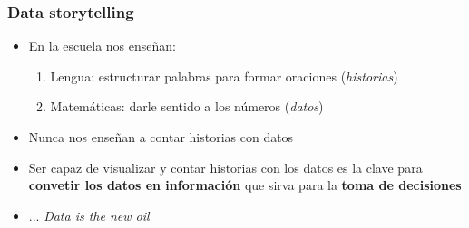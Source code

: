 \begin{frame}
    \frametitle{Data storytelling}
    \begin{itemize}
        \item<1-> En la escuela nos enseñan:
        \begin{enumerate}
            \item<2-> Lengua: estructurar palabras para formar oraciones (\textit{historias})
            \item<3-> Matemáticas: darle sentido a los números (\textit{datos})
        \end{enumerate}
        \item<4-> Nunca nos enseñan a contar historias con datos
        \item<5-> Ser capaz de visualizar y contar historias con los datos es la clave para \textbf{convetir los datos en información} que sirva para la \textbf{toma de decisiones}
        \item<6-> ... \textit{Data is the new oil}
  \end{itemize}
\end{frame}